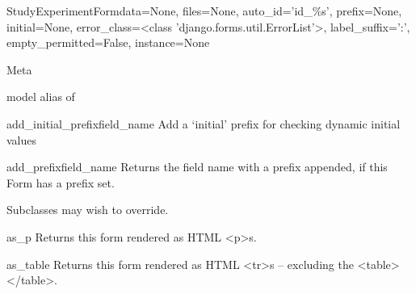 \documentclass[letterpaper,10pt,english]{sphinxmanual}
\begin{document}
\hypertarget{data.forms.StudyExperimentForm}{}\begin{classdesc}{StudyExperimentForm}{data=None, files=None, auto\_id='id\_\%s', prefix=None, initial=None, error\_class=\textless{}class 'django.forms.util.ErrorList'\textgreater{}, label\_suffix=':', empty\_permitted=False, instance=None}~

\hypertarget{data.forms.StudyExperimentForm.Meta}{}\begin{classdesc}{Meta}{}~

\hypertarget{data.forms.StudyExperimentForm.Meta.model}{}\begin{memberdesc}{model}
alias of 
\end{memberdesc}
\end{classdesc}

\hypertarget{data.forms.StudyExperimentForm.add_initial_prefix}{}\begin{methoddesc}[StudyExperimentForm]{add\_initial\_prefix}{field\_name}
Add a `initial' prefix for checking dynamic initial values
\end{methoddesc}

\hypertarget{data.forms.StudyExperimentForm.add_prefix}{}\begin{methoddesc}[StudyExperimentForm]{add\_prefix}{field\_name}
Returns the field name with a prefix appended, if this Form has a
prefix set.

Subclasses may wish to override.
\end{methoddesc}

\hypertarget{data.forms.StudyExperimentForm.as_p}{}\begin{methoddesc}[StudyExperimentForm]{as\_p}{}
Returns this form rendered as HTML \textless{}p\textgreater{}s.
\end{methoddesc}

\hypertarget{data.forms.StudyExperimentForm.as_table}{}\begin{methoddesc}[StudyExperimentForm]{as\_table}{}
Returns this form rendered as HTML \textless{}tr\textgreater{}s -- excluding the \textless{}table\textgreater{}\textless{}/table\textgreater{}.
\end{methoddesc}


\end{classdesc}
\end{document}
